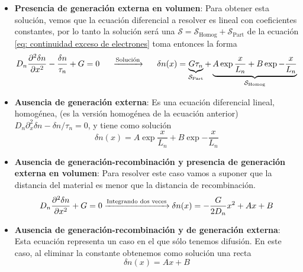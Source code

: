 \begin{itemize}
    \item \textbf{Presencia de generación externa en volumen}: Para obtener esta solución, vemos que la ecuación diferencial a resolver es lineal con coeficientes constantes, por lo tanto la solución será una $\mathcal{S}=\mathcal{S_\mathrm{Homog}}+\mathcal{S_\mathrm{Part}}$ de la ecuación \ref{eq: continuidad exceso de electrones} toma entonces la forma
    \begin{equation}
        D_n\pdiff[2]{\delta n}{x} -\frac{\delta n}{\tau_n} + G=0 \hspace{0.5cm} \xrightarrow{\text{Solución}} \hspace{0.5cm} \delta n (x)=\underbrace{G\tau_n}_{\mathcal{S_\mathrm{Part}}}+\underbrace{A\exp{\frac{x}{L_n}}+B\exp{-\frac{x}{L_n}}}_{\mathcal{S_\mathrm{Homog}}}
        \label{eq: Cont Generacion en volumen}
    \end{equation}
    \item \textbf{Ausencia de generación externa}: Es una ecuación diferencial lineal, homogénea, (es la versión homogénea de la ecuación anterior)  $D_n\partial^2_x\delta n-\delta n/\tau_n=0$, y tiene como solución 
    \begin{equation}
        \delta n (x)= A\exp{\frac{x}{L_n}}+B\exp{-\frac{x}{L_n}}
        \label{eq: Cont No generacion en volumen}
    \end{equation}
    \item \textbf{Ausencia de generación-recombinación y presencia de generación externa en volumen}: Para resolver este caso vamos a suponer que la distancia del material es menor que la distancia de recombinación. 
    \begin{equation}
         D_n\pdiff[2]{\delta n}{x} + G=0 \xrightarrow{\text{Integrando dos veces}} \delta n(x)=-\frac{G}{2D_n}x^2+Ax+B
         \label{eq: Cont No gen-rec}
    \end{equation}
    \item \textbf{Ausencia de generación-recombinación y de generación externa}: Esta ecuación representa un caso en el que sólo tenemos difusión. En este caso, al eliminar la constante obtenemos como solución una recta 
    \begin{equation}
    \delta n (x)=Ax+B
    \label{eq: Cont No gen-rec no generacion en volumen}
    \end{equation}
\end{itemize}
\newpage
